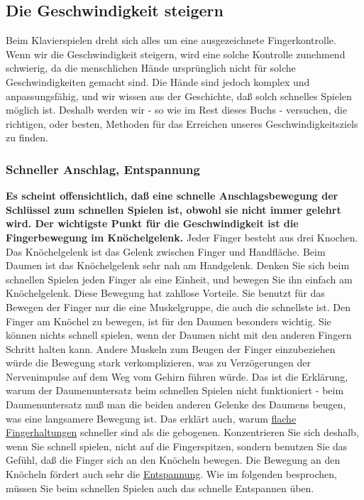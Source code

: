 
\subsection{Die Geschwindigkeit steigern}\hypertarget{c1iii7i}{}

Beim Klavierspielen dreht sich alles um eine ausgezeichnete Fingerkontrolle.
Wenn wir die Geschwindigkeit steigern, wird eine solche Kontrolle zunehmend schwierig, da die menschlichen Hände ursprünglich nicht für solche Geschwindigkeiten gemacht sind.
Die Hände sind jedoch komplex und anpassungsfähig, und wir wissen aus der Geschichte, daß solch schnelles Spielen möglich ist.
Deshalb werden wir - so wie im Rest dieses Buchs - versuchen, die richtigen, oder besten, Methoden für das Erreichen  unseres Geschwindigkeitsziels zu finden.


\subsubsection{Schneller Anschlag, Entspannung}\hypertarget{c1iii7iAnschlag}{}

\textbf{Es scheint offensichtlich, daß eine schnelle Anschlagsbewegung der Schlüssel zum schnellen Spielen ist, obwohl sie nicht immer gelehrt wird.
Der wichtigste Punkt für die Geschwindigkeit ist die Fingerbewegung im Knöchelgelenk.}
Jeder Finger besteht aus drei Knochen.
Das Knöchelgelenk ist das Gelenk zwischen Finger und Handfläche.
Beim Daumen ist das Knöchelgelenk sehr nah am Handgelenk.
Denken Sie sich beim schnellen Spielen jeden Finger als eine Einheit, und bewegen Sie ihn einfach am Knöchelgelenk.
Diese Bewegung hat zahllose Vorteile.
Sie benutzt für das Bewegen der Finger nur die eine Muskelgruppe, die auch die schnellste ist.
Den Finger am Knöchel zu bewegen, ist für den Daumen besonders wichtig.
Sie können nichts schnell spielen, wenn der Daumen nicht mit den anderen Fingern Schritt halten kann.
Andere Muskeln zum Beugen der Finger einzubeziehen würde die Bewegung stark verkomplizieren, was zu Verzögerungen der Nervenimpulse auf dem Weg vom Gehirn führen würde.
Das ist die Erklärung, warum der Daumenuntersatz beim schnellen Spielen nicht funktioniert - beim Daumenuntersatz muß man die beiden anderen Gelenke des Daumens beugen, was eine langsamere Bewegung ist.
Das erklärt auch, warum \hyperlink{c1iii4b}{flache Fingerhaltungen} schneller sind als die gebogenen.
Konzentrieren Sie sich deshalb, wenn Sie schnell spielen, nicht auf die Fingerspitzen, sondern benutzen Sie das Gefühl, daß die Finger sich an den Knöcheln bewegen.
Die Bewegung an den Knöcheln fördert auch sehr die \hyperlink{c1ii14}{Entspannung}.
Wie im folgenden besprochen, müssen Sie beim schnellen Spielen auch das schnelle Entspannen üben.

